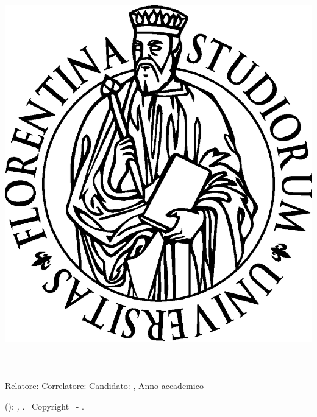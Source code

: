 \begin{titlepage}
	\begin{center}
   	\large
      \hfill
      \vfill
      \begingroup
			\spacedallcaps{\myUni} \\ 
			\myFaculty \\
			\myDegree \\ 
			\vspace{0.5cm}
         \includegraphics[width=.2\textwidth]{logo/logoUnifi.eps}\\
         \vspace{0.5cm}    
      \endgroup 
      \vfill 
      \begingroup
      	\color{Maroon}\spacedallcaps{\myTitle} \\ \bigskip
      \endgroup
      \begingroup
      	\small\color{Maroon}\spacedallcaps{\mySubtitle} \\ \bigskip
      \endgroup
      \mySubsubtitle\\
      \vfill
      Relatore: {\itshape\myProf}\hfill Correlatore: {\itshape\mySupervisor}
      \vfill  
      Candidato: \spacedlowsmallcaps{\myName}
      \vfill
      {\itshape\myMonth \myYear}, Anno accademico {\itshape\myAcademicYear}
      \vfill                      
	\end{center}        
\end{titlepage}   
   \newpage
	\thispagestyle{empty}
	\hfill
	\vfill
	\noindent\myName(\texttt{\myMail}): 
	\textit{\myTitle,} 
	\myDegree. \textcopyright\ Copyright \myYear \myName\ - \mycopyright.
